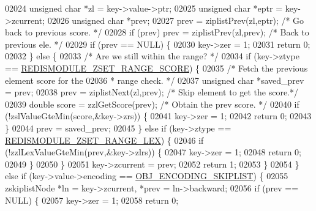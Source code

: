 \begin{DoxyCode}
{{{02024         \textcolor{keywordtype}{unsigned} \textcolor{keywordtype}{char} *zl = key->value->ptr;
02025         \textcolor{keywordtype}{unsigned} \textcolor{keywordtype}{char} *eptr = key->zcurrent;
02026         \textcolor{keywordtype}{unsigned} \textcolor{keywordtype}{char} *prev;
02027         prev = ziplistPrev(zl,eptr); \textcolor{comment}{/* Go back to previous score. */}
02028         \textcolor{keywordflow}{if} (prev) prev = ziplistPrev(zl,prev); \textcolor{comment}{/* Back to previous ele. */}
02029         \textcolor{keywordflow}{if} (prev == NULL) \{
02030             key->zer = 1;
02031             \textcolor{keywordflow}{return} 0;
02032         \} \textcolor{keywordflow}{else} \{
02033             \textcolor{comment}{/* Are we still within the range? */}
02034             \textcolor{keywordflow}{if} (key->ztype == \hyperlink{module_8c_a103d0f18dc1536298a03324d5ba545be}{REDISMODULE\_ZSET\_RANGE\_SCORE}) \{
02035                 \textcolor{comment}{/* Fetch the previous element score for the}
02036 \textcolor{comment}{                 * range check. */}
02037                 \textcolor{keywordtype}{unsigned} \textcolor{keywordtype}{char} *saved\_prev = prev;
02038                 prev = ziplistNext(zl,prev); \textcolor{comment}{/* Skip element to get the score.*/}
02039                 \textcolor{keywordtype}{double} score = zzlGetScore(prev); \textcolor{comment}{/* Obtain the prev score. */}
02040                 \textcolor{keywordflow}{if} (!zslValueGteMin(score,&key->zrs)) \{
02041                     key->zer = 1;
02042                     \textcolor{keywordflow}{return} 0;
02043                 \}
02044                 prev = saved\_prev;
02045             \} \textcolor{keywordflow}{else} \textcolor{keywordflow}{if} (key->ztype == \hyperlink{module_8c_a36d7bac3b2781ba9b076ee6feee141a1}{REDISMODULE\_ZSET\_RANGE\_LEX}) \{
02046                 \textcolor{keywordflow}{if} (!zzlLexValueGteMin(prev,&key->zlrs)) \{
02047                     key->zer = 1;
02048                     \textcolor{keywordflow}{return} 0;
02049                 \}
02050             \}
02051             key->zcurrent = prev;
02052             \textcolor{keywordflow}{return} 1;
02053         \}
02054     \} \textcolor{keywordflow}{else} \textcolor{keywordflow}{if} (key->value->encoding == \hyperlink{server_8h_acfb35db5cb30ed113ed23aeb1a224c4c}{OBJ\_ENCODING\_SKIPLIST}) \{
02055         zskiplistNode *ln = key->zcurrent, *prev = ln->backward;
02056         \textcolor{keywordflow}{if} (prev == NULL) \{
02057             key->zer = 1;
02058             \textcolor{keywordflow}{return} 0;
}}}
\end{DoxyCode}
